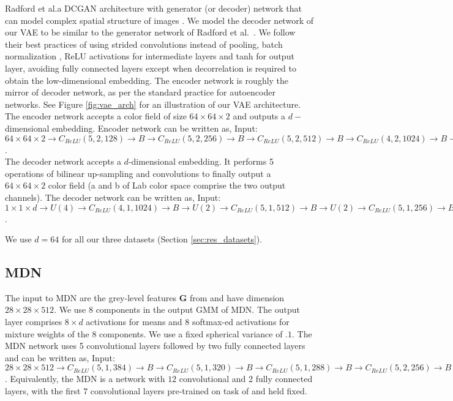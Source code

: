 \documentclass[10pt,twocolumn,letterpaper]{article}
\begin{document}
Radford et al.\propose a DCGAN architecture with generator (or decoder) network 
that can model complex spatial structure of images \cite{DCGAN}. We model the 
decoder network of our VAE to be similar to the 
generator network of Radford et al.~\cite{DCGAN}. We follow their best practices of
using strided convolutions instead of pooling, batch normalization \cite{BN}, ReLU activations for 
intermediate layers and tanh for output layer, avoiding fully connected layers
except when decorrelation is required to obtain the low-dimensional embedding. The encoder 
network is roughly the mirror of decoder network, as per the standard practice 
for autoencoder networks. See Figure \ref{fig:vae_arch} for an illustration of our VAE 
architecture.\\

 The encoder network accepts a color field of size $64 \times 64 \times 2$
and outputs a $d-$dimensional embedding. Encoder network can be written as,  
Input: $64 \times 64 \times 2 \rightarrow C_{ReLU}(5, 2, 128) \rightarrow B \rightarrow C_{ReLU}(5, 2, 256)
\rightarrow B \rightarrow C_{ReLU}(5, 2, 512) \rightarrow B \rightarrow C_{ReLU}(4, 2, 1024) 
\rightarrow B \rightarrow F(d)$. \\

 The decoder network accepts a $d$-dimensional embedding.
It performs 5 operations of bilinear up-sampling and convolutions to finally output a 
$64 \times 64 \times 2$ color field (a and b of Lab color space comprise the two 
output channels). The decoder network can be written as, 
Input: $1 \times 1 \times d \rightarrow U(4) \rightarrow C_{ReLU}(4, 1, 1024) \rightarrow
B \rightarrow U(2) \rightarrow C_{ReLU}(5, 1, 512) \rightarrow B \rightarrow U(2) 
\rightarrow C_{ReLU}(5, 1, 256) \rightarrow B \rightarrow U(2) \rightarrow C_{ReLU}(5, 1, 128) \rightarrow B 
\rightarrow U(2) \rightarrow C_{tanh}(5, 1, 2)$.  


We use $d=64$ for all our three datasets (Section \ref{sec:res_datasets}).

\subsection{MDN}\label{sec:arch_mdn}
The input to MDN are the grey-level features $\mathbf{G}$ from \cite{ZhangColorful}
and have dimension $28 \times 28 \times 512$. We use $8$ components in the output 
GMM of MDN. The output layer comprises $8 \times d$ activations for means and $8$ 
softmax-ed activations for mixture weights of the $8$ components. We use a fixed spherical variance of 
$.1$. The MDN network
uses 5 convolutional layers followed by two fully connected layers and
can be written as, Input: $28 \times 28 \times 512 \rightarrow C_{ReLU}(5, 1, 384) \rightarrow B 
\rightarrow C_{ReLU}(5, 1, 320) \rightarrow B \rightarrow C_{ReLU}(5, 1, 288) \rightarrow B 
\rightarrow C_{ReLU}(5, 2, 256) \rightarrow B \rightarrow C_{ReLU}(5, 1, 128) \rightarrow B 
\rightarrow FC(4096) \rightarrow FC(8 \times d + 8)$. Equivalently, the MDN
is a network with $12$ convolutional and 2 fully connected layers, with the first $7$ 
convolutional layers pre-trained on task of \cite{ZhangColorful} and held fixed.
\end{document}
